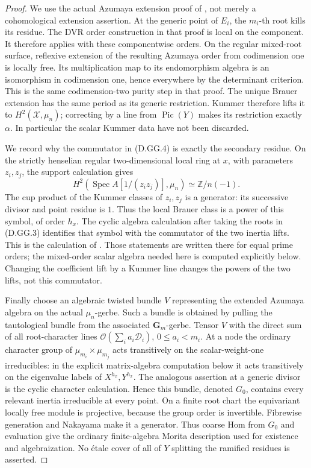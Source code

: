 \begin{proof}
We use the actual Azumaya extension proof of
\citet[Proposition3.2.1, complete pp10--11]
{Lieblich2011ResidualD}, not merely a cohomological
extension assertion. At the generic point of \(E_i\),
the \(m_i\)-th root kills its residue. The DVR order
construction in that proof is local on the component.
It therefore applies with these componentwise orders.
On the regular mixed-root surface, reflexive extension
of the resulting Azumaya order from codimension one is
locally free. Its multiplication map to its endomorphism
algebra is an isomorphism in codimension one, hence
everywhere by the determinant criterion. This is the
same codimension-two purity step in that proof.
The unique Brauer extension has the same period as
its generic restriction. Kummer therefore lifts it to
\(H^2(\mathcal X,\mu_n)\); correcting by a line from
\(\operatorname{Pic}(Y)\) makes its restriction exactly
\(\alpha\). In particular the scalar Kummer data have
not been discarded.

We record why the commutator in (D.GG.4) is exactly
the secondary residue. On the strictly henselian
regular two-dimensional local ring at \(x\), with
parameters \(z_i,z_j\), the support calculation gives
\[
 H^2(\operatorname{Spec}A[1/(z_i z_j)],\mu_n)
       \simeq\mathbb Z/n(-1).
\]
The cup product of the Kummer classes of \(z_i,z_j\)
is a generator: its successive divisor and point
residue is \(1\). Thus the local Brauer class is a
power of this symbol, of order \(h_x\). The cyclic
algebra calculation after taking the roots in (D.GG.3)
identifies that symbol with the commutator of the two
inertia lifts. This is the calculation of
\citet[Lemma4.3.1, Proposition4.3.2 and the explicit
matrices in Proposition4.3.7, pp13--15]
{Lieblich2011ResidualD}. Those statements are written
there for equal prime orders; the mixed-order scalar
algebra needed here is computed explicitly below.
Changing the coefficient lift by a Kummer line changes
the powers of the two lifts, not this commutator.

Finally choose an algebraic twisted bundle \(V\)
representing the extended Azumaya algebra on the
actual \(\mu_n\)-gerbe. Such a bundle is obtained by
pulling the tautological bundle from the associated
\(\mathbf G_m\)-gerbe. Tensor \(V\) with the direct
sum of all root-character lines
\(\mathcal O(\sum_i a_i\mathcal D_i)\), \(0\leq a_i<m_i\).
At a node the ordinary character group of
\(\mu_{m_i}\times\mu_{m_j}\) acts transitively on the
scalar-weight-one irreducibles: in the explicit
matrix-algebra computation below it acts transitively
on the eigenvalue labels of \(X^{h_x},Y^{h_x}\).
The analogous assertion at a generic divisor is the
cyclic character calculation. Hence this bundle,
denoted \(G_0\), contains every relevant inertia
irreducible at every point. On a finite root chart
the equivariant locally free module is projective,
because the group order is invertible. Fibrewise
generation and Nakayama make it a generator.
Thus coarse Hom from \(G_0\) and evaluation give the
ordinary finite-algebra Morita description used for
existence and algebraization. No étale cover of all
of \(Y\) splitting the ramified residues is asserted.
\end{proof}

